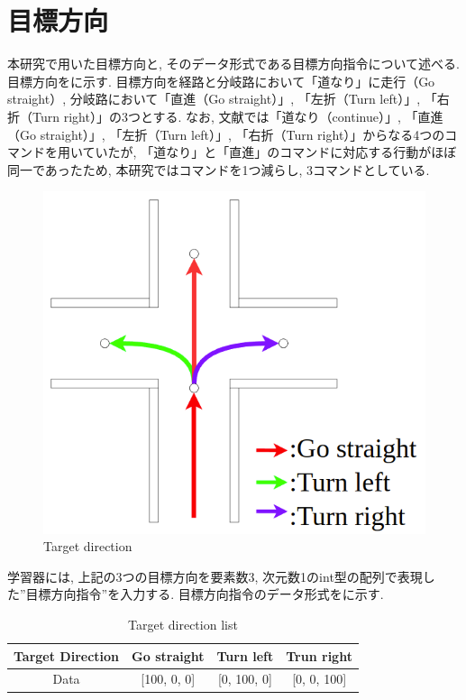 
\section{目標方向}
本研究で用いた目標方向と, そのデータ形式である目標方向指令について述べる. 目標方向をに示す. 目標方向を経路と分岐路において「道なり」に走行（Go straight）, 分岐路において「直進（Go straight）」, 「左折（Turn left）」, 「右折（Turn right）」の3つとする. なお, 文献\cite{mech}では「道なり（continue）」, 「直進（Go straight）」, 「左折（Turn left）」, 「右折（Turn right）」からなる4つのコマンドを用いていたが, 「道なり」と「直進」のコマンドに対応する行動がほぼ同一であったため, 本研究ではコマンドを1つ減らし, 3コマンドとしている.

\begin{figure}[hbtp]
  \centering
 \includegraphics[keepaspectratio, scale=0.38]
      {images/direction.png}
 \caption{Target direction}
 \label{Fig:direction}
\end{figure}

学習器には, 上記の3つの目標方向を要素数3, 次元数1のint型の配列で表現した”目標方向指令”を入力する. 目標方向指令のデータ形式をに示す.

\begin{table}[hbtp]
  \caption{Target direction list}
  \label{table:direction}
  \centering
  \begin{tabular}{|c|c|c|c|}
    \hline
    Target Direction  & Go straight & Turn left & Trun right\\
    \hline
    Data & [100, 0, 0] & [0, 100, 0] & [0, 0, 100]\\
    \hline
  \end{tabular}
\end{table}


\newpage
